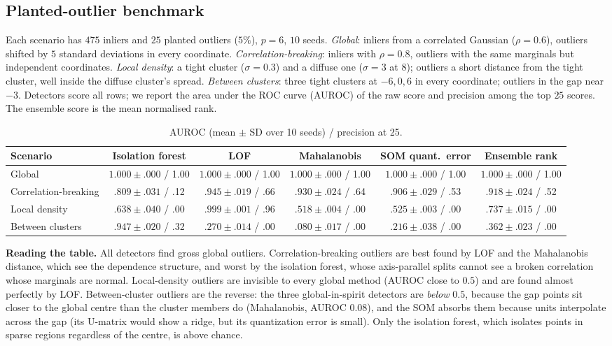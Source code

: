 \documentclass[conference]{IEEEtran}
\begin{document}
\subsection{Planted-outlier benchmark}
Each scenario has $475$ inliers and $25$ planted outliers ($5\%$), $p=6$, $10$ seeds. \emph{Global}: inliers from a correlated Gaussian ($\rho=0.6$), outliers shifted by $5$ standard deviations in every coordinate. \emph{Correlation-breaking}: inliers with $\rho=0.8$, outliers with the same marginals but independent coordinates. \emph{Local density}: a tight cluster ($\sigma=0.3$) and a diffuse one ($\sigma=3$ at $8$); outliers a short distance from the tight cluster, well inside the diffuse cluster's spread. \emph{Between clusters}: three tight clusters at $-6,0,6$ in every coordinate; outliers in the gap near $-3$. Detectors score all rows; we report the area under the ROC curve (AUROC) of the raw score and precision among the top $25$ scores. The ensemble score is the mean normalised rank.
\begin{table}[t]\caption{AUROC (mean $\pm$ SD over 10 seeds) / precision at 25.}\label{tab:bench}\centering\scriptsize
\begin{tabular}{@{}lccccc@{}}\toprule
Scenario & Isolation forest & LOF & Mahalanobis & SOM quant.\ error & Ensemble rank \\\midrule
Global & $1.000\pm.000$ / 1.00 & $1.000\pm.000$ / 1.00 & $1.000\pm.000$ / 1.00 & $1.000\pm.000$ / 1.00 & $1.000\pm.000$ / 1.00 \\
Correlation-breaking & $.809\pm.031$ / .12 & $.945\pm.019$ / .66 & $.930\pm.024$ / .64 & $.906\pm.029$ / .53 & $.918\pm.024$ / .52 \\
Local density & $.638\pm.040$ / .00 & $\mathbf{.999}\pm.001$ / .96 & $.518\pm.004$ / .00 & $.525\pm.003$ / .00 & $.737\pm.015$ / .00 \\
Between clusters & $\mathbf{.947}\pm.020$ / .32 & $.270\pm.014$ / .00 & $.080\pm.017$ / .00 & $.216\pm.038$ / .00 & $.362\pm.023$ / .00 \\\bottomrule
\end{tabular}\end{table}
\textbf{Reading the table.} All detectors find gross global outliers. Correlation-breaking outliers are best found by LOF and the Mahalanobis distance, which see the dependence structure, and worst by the isolation forest, whose axis-parallel splits cannot see a broken correlation whose marginals are normal. Local-density outliers are invisible to every global method (AUROC close to $0.5$) and are found almost perfectly by LOF. Between-cluster outliers are the reverse: the three global-in-spirit detectors are \emph{below} $0.5$, because the gap points sit closer to the global centre than the cluster members do (Mahalanobis, AUROC $0.08$), and the SOM absorbs them because units interpolate across the gap (its U-matrix would show a ridge, but its quantization error is small). Only the isolation forest, which isolates points in sparse regions regardless of the centre, is above chance.
\end{document}
